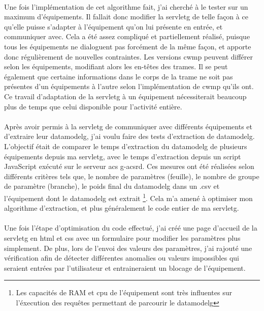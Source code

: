 \documentclass[12pt,a4paper]{report}
\begin{document}
\paragraph*{} Une fois l’implémentation de cet algorithme fait, j’ai cherché à le tester sur un maximum d’équipements. Il fallait donc modifier la \gls{servletg} de telle façon à ce qu’elle puisse s’adapter à l’équipement qu’on lui présente en entrée, et communiquer avec. Cela a été assez compliqué et partiellement réalisé, puisque tous les équipements ne dialoguent pas forcément de la même façon, et apporte donc régulièrement de nouvelles contraintes. Les versions \gls{cwmp} peuvent différer selon les équipements, modifiant alors les en-têtes des trames. Il se peut également que certaine informations dans le corps de la trame ne soit pas présentes d'un équipements à l'autre selon l'implémentation de \gls{cwmp} qu'ils ont.  Ce travail d’adaptation de la \gls{servletg} à un équipement nécessiterait beaucoup plus de temps que celui disponible pour l’activité entière.
\paragraph*{}Après avoir permis à la \gls{servletg} de communiquer avec différents équipements et d’extraire leur \gls{datamodelg}, j’ai voulu faire des tests d’extraction de \gls{datamodelg}. L’objectif était de comparer le temps d’extraction du \gls{datamodelg} de plusieurs équipements depuis ma \gls{servletg}, avec le temps d’extraction depuis un script JavaScript exécuté sur le serveur \gls{acs} g-acsrd. Ces mesures ont été réalisées selon différents critères tels que, le nombre de paramètres (feuille), le nombre de groupe de paramètre (branche), le poids final du \gls{datamodelg} dans un .csv et l’équipement dont le \gls{datamodelg} est extrait \footnote{Les capacités de RAM et cpu de l'équipement sont très influentes sur l'éxecution des requêtes permettant de parcourir le \gls{datamodelg}}. Cela m’a amené à optimiser mon algorithme d’extraction, et plus généralement le code entier de ma \gls{servletg}.
\paragraph*{}Une fois l’étape d’optimisation du code effectué, j’ai créé une page d'accueil de la \gls{servletg} en html et css avec un formulaire pour modifier les paramètres plus simplement. De plus, lors de l’envoi des valeurs des paramètres, j’ai rajouté une vérification afin de détecter différentes anomalies ou valeurs impossibles qui seraient entrées par l’utilisateur et entraineraient un blocage de l’équipement.
\end{document}
